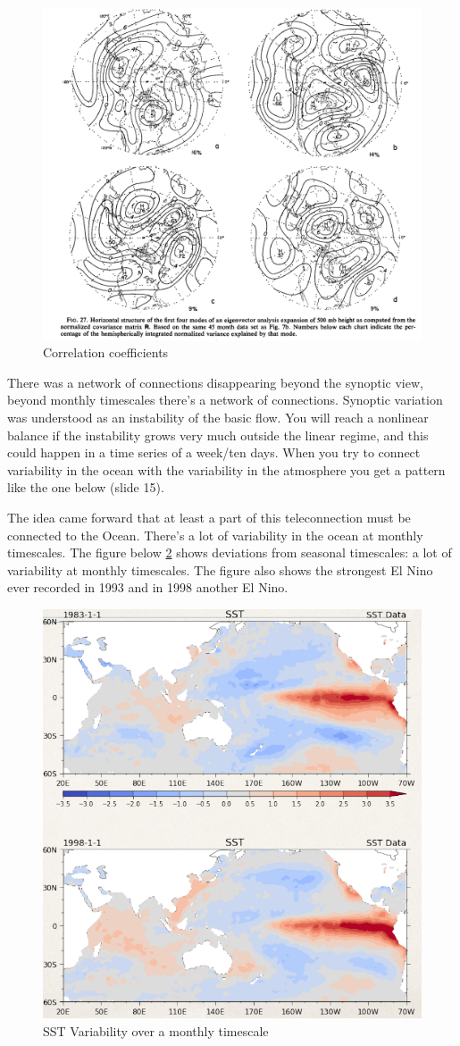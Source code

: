\begin{figure}[h!]
    \centering
    \includegraphics[width=0.5\linewidth]{uploads/Screenshot 2024-11-15 155150.png}
    \caption{Correlation coefficients}
    \label{fig:correlation coeff}
\end{figure}
There was a network of connections disappearing beyond the synoptic view, beyond monthly timescales there's a network of connections. Synoptic variation was understood as an instability of the basic flow. You will reach a nonlinear balance if the instability grows very much outside the linear regime, and this could happen in a time series of a week/ten days. 
When you try to connect variability in the ocean with the variability in the atmosphere you get a pattern like the one below (slide 15).

The idea came forward that at least a part of this teleconnection must be connected to the Ocean. There's a lot of variability in the ocean at monthly timescales. The figure below \ref{fig:SST VAR} shows deviations from seasonal timescales: a lot of variability at monthly timescales. The figure also shows the strongest El Nino ever recorded in 1993 and in 1998 another El Nino.
\begin{figure}[h!]
    \centering
    \includegraphics[width=0.5\linewidth]{uploads/Screenshot 2024-11-18 164612.png}
    \caption{SST Variability over a monthly timescale}
    \label{fig:SST VAR}
\end{figure}

